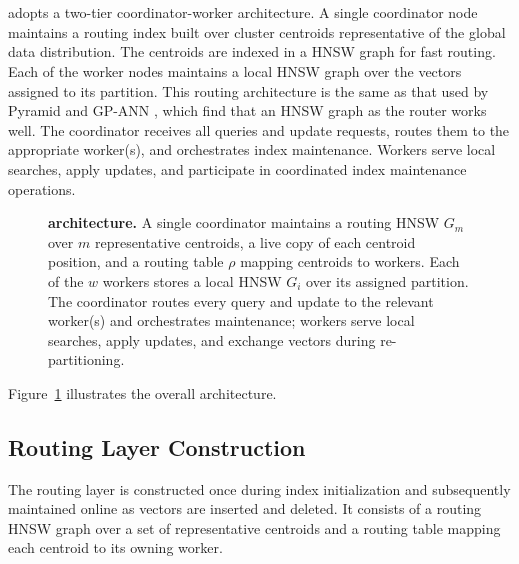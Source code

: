 \documentclass[sigconf,review,anonymous]{acmart}
\begin{document}
\section{\SystemName{}}
    \SystemName{} adopts a two-tier  coordinator-worker architecture. A single coordinator node maintains a routing index built over cluster centroids representative of the global data distribution. The centroids are indexed in a HNSW graph for fast routing. Each of the worker nodes maintains a local HNSW graph over the vectors assigned to its partition. This routing architecture is the same as that used by Pyramid \cite{deng2019pyramid} and GP-ANN \cite{gottensuren2025unleashing}, which find that an HNSW graph as the router works well. The coordinator receives all queries and update requests, routes them to the appropriate worker(s), and orchestrates index maintenance. Workers serve local searches, apply updates, and participate in coordinated index maintenance operations.

    \begin{figure}
        \centering
        \caption{\textbf{\SystemName{} architecture.} A single coordinator maintains a routing HNSW $G_m$ over $m$ representative centroids, a live copy of each centroid position, and a routing table $\rho$ mapping centroids to workers. Each of the $w$ workers stores a local HNSW $G_i$ over its assigned partition. The coordinator routes every query and update to the relevant worker(s) and orchestrates maintenance; workers serve local searches, apply updates, and exchange vectors during re-partitioning.}
        \label{fig:architecture}
    \end{figure}

    Figure~\ref{fig:architecture} illustrates the overall architecture.

\subsection{Routing Layer Construction}
    The routing layer is constructed once during index initialization and subsequently maintained online as vectors are inserted and deleted. It consists of a routing HNSW graph over a set of representative centroids and a routing table mapping each centroid to its owning worker.
\end{document}
